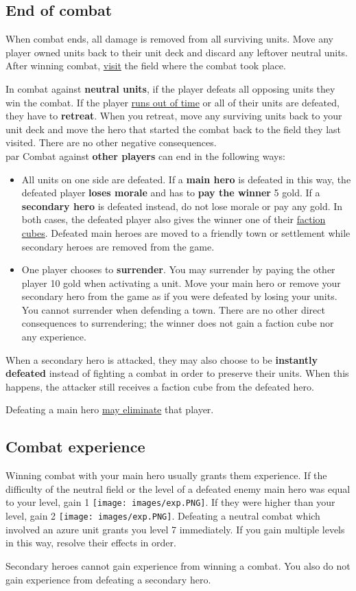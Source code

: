 \documentclass[12pt]{article}
\begin{document}
\subsection*{\hypertarget{Endcombat}{End of combat}}
When combat ends, all damage is removed from all surviving units. Move any player owned units back to their unit deck and discard any leftover neutral units. After winning combat, \hyperlink{Categories}{visit} the field where the combat took place.\par
In combat against \textbf{neutral units}, if the player defeats all opposing units they win the combat. If the player \hyperlink{Timelimit}{runs out of time} or all of their units are defeated, they have to \textbf{retreat}. When you retreat, move any surviving units back to your unit deck and move the hero that started the combat back to the field they last visited. There are no other negative consequences.\\par
Combat against \textbf{other players} can end in the following ways:
\begin{itemize}
    \item All units on one side are defeated. If a \textbf{main hero} is defeated in this way, the defeated player \textbf{loses morale} and has to \textbf{pay the winner} 5 gold. If a \textbf{secondary hero} is defeated instead, do not lose morale or pay any gold. In both cases, the defeated player also gives the winner one of their \hyperlink{End}{faction cubes}. Defeated main heroes are moved to a friendly town or settlement while secondary heroes are removed from the game.
    \item One player chooses to \textbf{surrender}. You may surrender by paying the other player 10 gold when activating a unit. Move your main hero or remove your secondary hero from the game as if you were defeated by losing your units. You cannot surrender when defending a town. There are no other direct consequences to surrendering; the winner does not gain a faction cube nor any experience.
\end{itemize}
 When a secondary hero is attacked, they may also choose to be \textbf{instantly defeated} instead of fighting a combat in order to preserve their units. When this happens, the attacker still receives a faction cube from the defeated hero.\par Defeating a main hero \hyperlink{End}{may eliminate} that player.

\subsection*{\hypertarget{Combatexperience}{Combat experience}}
Winning combat with your main hero usually grants them experience. If the difficulty of the neutral field or the level of a defeated enemy main hero was equal to your level, gain 1 \texttt{[image: images/exp.PNG]}. If they were higher than your level, gain 2 \texttt{[image: images/exp.PNG]}. Defeating a neutral combat which involved an azure unit grants you level 7 immediately. If you gain multiple levels in this way, resolve their effects in order.\par
Secondary heroes cannot gain experience from winning a combat. You also do not gain experience from defeating a secondary hero.
\end{document}
